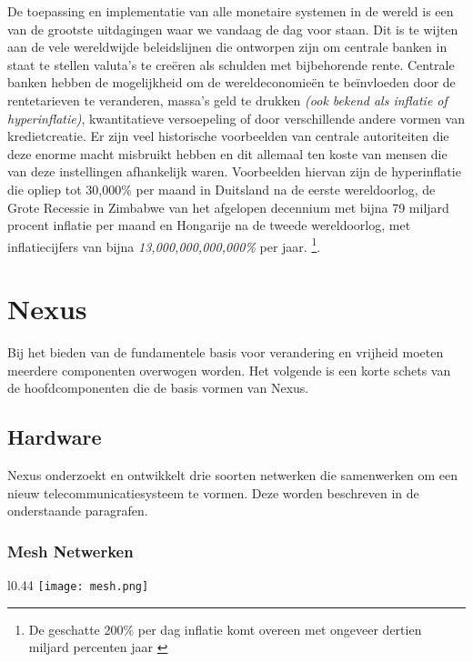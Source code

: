 \documentclass[11pt]{article}
\begin{document}
De toepassing en implementatie van alle monetaire systemen in de wereld is een van de grootste uitdagingen waar we vandaag de dag voor staan. Dit is te wijten aan de vele wereldwijde beleidslijnen die ontworpen zijn om centrale banken in staat te stellen valuta's te cre\"eren als schulden met bijbehorende rente. Centrale banken hebben de mogelijkheid om de wereldeconomie\"en te beïnvloeden door de rentetarieven te veranderen, massa's geld te drukken \textit{(ook bekend als inflatie of hyperinflatie)}, kwantitatieve versoepeling of door verschillende andere vormen van kredietcreatie. Er zijn veel historische voorbeelden van centrale autoriteiten die deze enorme macht misbruikt hebben en dit allemaal ten koste van mensen die van deze instellingen afhankelijk waren. Voorbeelden hiervan zijn de hyperinflatie die opliep tot 30,000\% per maand in Duitsland na de eerste wereldoorlog, de Grote Recessie in Zimbabwe van het afgelopen decennium met bijna 79 miljard procent inflatie per maand en Hongarije na de tweede wereldoorlog, met inflatiecijfers van bijna \textit{13,000,000,000,000\%} per jaar.  \footnote{De geschatte 200\% per dag inflatie komt overeen met ongeveer dertien miljard percenten jaar \cite{hyperinflation}}.


\section{Nexus}

Bij het bieden van de fundamentele basis voor verandering en vrijheid moeten meerdere componenten overwogen worden. 
Het volgende is een korte schets van de hoofdcomponenten die de basis vormen van Nexus.

\subsection{Hardware}

Nexus onderzoekt en ontwikkelt drie soorten netwerken die samenwerken om een ​​nieuw telecommunicatiesysteem te vormen. Deze worden beschreven in de onderstaande paragrafen.

\newpage

\subsubsection{Mesh Netwerken}

\begin{wrapfigure}[14]{l}{0.44\textwidth}
    \centering
    \vspace{-20pt}
    \texttt{[image: mesh.png]}
\end{wrapfigure}
\end{document}
